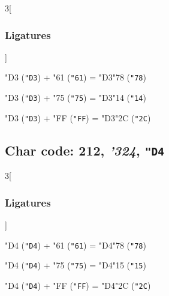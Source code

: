 \documentclass{article}
\newlength{\maxcharwidth}
\begin{document}
\begin{multicols}{3}[\subsubsection{Ligatures}]

{\testfont\char"D3\noboundary} ({\tt"D3}) + {\testfont\char"61\noboundary} ({\tt"61}) = {\testfont\char"D3\noboundary}{\testfont\char"78\noboundary} ({\tt"78}) 

{\testfont\char"D3\noboundary} ({\tt"D3}) + {\testfont\char"75\noboundary} ({\tt"75}) = {\testfont\char"D3\noboundary}{\testfont\char"14\noboundary} ({\tt"14}) 

{\testfont\char"D3\noboundary} ({\tt"D3}) + {\testfont\char"FF\noboundary} ({\tt"FF}) = {\testfont\char"D3\noboundary}{\testfont\char"2C\noboundary} ({\tt"2C}) 

\end{multicols}

\subsection{Char code: 212, {\it'324}, {\tt"D4}}
\label{char_212}


\begin{multicols}{3}[\subsubsection{Ligatures}]

{\testfont\char"D4\noboundary} ({\tt"D4}) + {\testfont\char"61\noboundary} ({\tt"61}) = {\testfont\char"D4\noboundary}{\testfont\char"78\noboundary} ({\tt"78}) 

{\testfont\char"D4\noboundary} ({\tt"D4}) + {\testfont\char"75\noboundary} ({\tt"75}) = {\testfont\char"D4\noboundary}{\testfont\char"15\noboundary} ({\tt"15}) 

{\testfont\char"D4\noboundary} ({\tt"D4}) + {\testfont\char"FF\noboundary} ({\tt"FF}) = {\testfont\char"D4\noboundary}{\testfont\char"2C\noboundary} ({\tt"2C}) 

\end{multicols}
\end{document}

